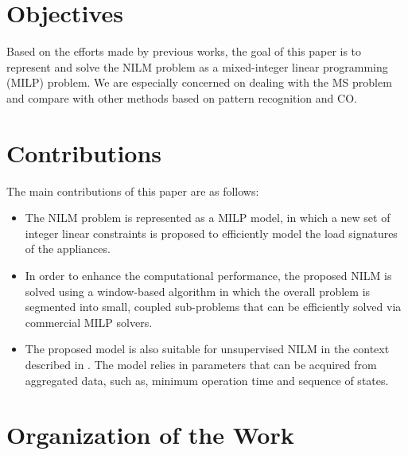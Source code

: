 \section{Objectives}

Based on the efforts made by previous works, the goal of this paper is to represent and solve the NILM problem as a mixed-integer linear programming (MILP) problem. We are especially concerned on dealing with the MS problem and compare with other methods based on pattern recognition and CO.


\section{Contributions}

The main contributions of this paper are as follows:

\begin{itemize}
\item The NILM problem is represented as a MILP model, in which a new set of integer linear constraints is proposed to efficiently model the load signatures of the appliances.
\item In order to enhance the computational performance, the proposed NILM is solved using a window-based algorithm in which the overall problem is segmented into small, coupled sub-problems that can be efficiently solved via commercial MILP solvers.
\item The proposed model is also suitable for unsupervised NILM in the context described in \cite{makonin2016}. The model relies in parameters that can be acquired from aggregated data, such as, minimum operation time and sequence of states.
\end{itemize}

\section{Organization of the Work}

